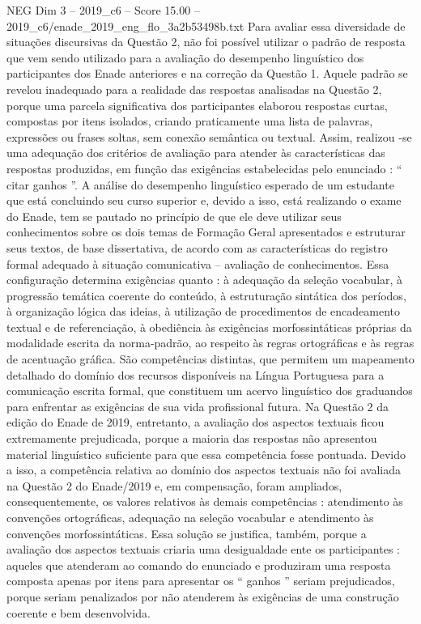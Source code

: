 \begin{textsample}{NEG Dim 3 – 2019\_c6 – Score 15.00 – 2019\_c6/enade\_2019\_eng\_flo\_3a2b53498b.txt}
Para avaliar essa diversidade de situações discursivas da Questão 2, não foi possível utilizar o padrão de resposta que vem sendo utilizado para a avaliação do desempenho linguístico dos participantes dos Enade anteriores e na correção da Questão 1.
Aquele padrão se revelou inadequado para a realidade das respostas analisadas na Questão 2, porque uma parcela significativa dos participantes elaborou respostas curtas, compostas por itens isolados, criando praticamente uma lista de palavras, expressões ou frases soltas, sem conexão semântica ou textual.
Assim, realizou -se uma adequação dos critérios de avaliação para atender às características das respostas produzidas, em função das exigências estabelecidas pelo enunciado : “ citar ganhos ”.
A análise do desempenho linguístico esperado de um estudante que está concluindo seu curso superior e, devido a isso, está realizando o exame do Enade, tem se pautado no princípio de que ele deve utilizar seus conhecimentos sobre os dois temas de Formação Geral apresentados e estruturar seus textos, de base dissertativa, de acordo com as características do registro formal adequado à situação comunicativa – avaliação de conhecimentos.
Essa configuração determina exigências quanto : à adequação da seleção vocabular, à progressão temática coerente do conteúdo, à estruturação sintática dos períodos, à organização lógica das ideias, à utilização de procedimentos de encadeamento textual e de referenciação, à obediência às exigências morfossintáticas próprias da modalidade escrita da norma-padrão, ao respeito às regras ortográficas e às regras de acentuação gráfica.
São competências distintas, que permitem um mapeamento detalhado do domínio dos recursos disponíveis na Língua Portuguesa para a comunicação escrita formal, que constituem um acervo linguístico dos graduandos para enfrentar as exigências de sua vida profissional futura.
Na Questão 2 da edição do Enade de 2019, entretanto, a avaliação dos aspectos textuais ficou extremamente prejudicada, porque a maioria das respostas não apresentou material linguístico suficiente para que essa competência fosse pontuada.
Devido a isso, a competência relativa ao domínio dos aspectos textuais não foi avaliada na Questão 2 do Enade/2019 e, em compensação, foram ampliados, consequentemente, os valores relativos às demais competências : atendimento às convenções ortográficas, adequação na seleção vocabular e atendimento às convenções morfossintáticas.
Essa solução se justifica, também, porque a avaliação dos aspectos textuais criaria uma desigualdade ente os participantes : aqueles que atenderam ao comando do enunciado e produziram uma resposta composta apenas por itens para apresentar os “ ganhos ” seriam prejudicados, porque seriam penalizados por não atenderem às exigências de uma construção coerente e bem desenvolvida.

\end{textsample}
